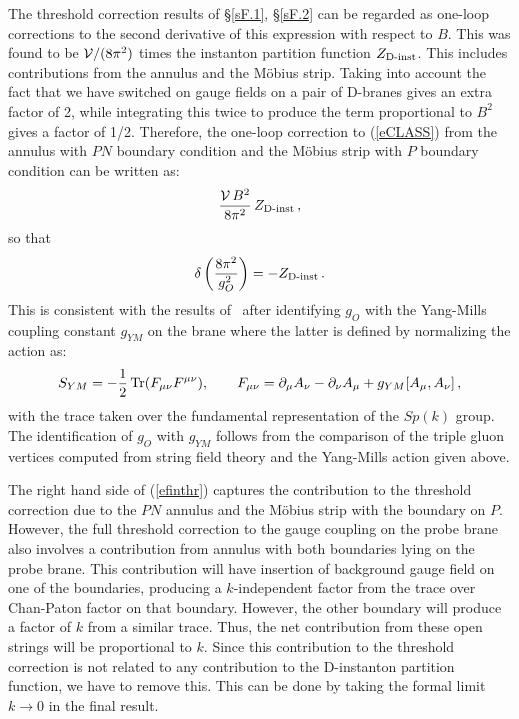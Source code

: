 \documentclass[12pt,a4paper]{article}
\newcommand{\be}{\begin{equation}}
\newcommand{\ee}{\end{equation}}
\newcommand{\refb}[1]{(\ref{#1})}
\newcommand{\p}{\partial}
\def\Tr{{\rm Tr} }
\newcommand{\VV}{{\cal V}}
\begin{document}
The threshold correction results of \S\ref{sF.1}, \S\ref{sF.2} can be regarded as one-loop corrections to the
second derivative of this expression with respect to $B$.
This was found to be $\VV/(8\pi^2)$ times the instanton partition function
$Z_{\mbox{\scriptsize D-inst}}$. This includes contributions from the annulus and
the M\"{o}bius strip. Taking into
account the fact that we have switched on gauge fields on
a pair of D-branes gives an extra factor of 2, while integrating this
twice to produce the term proportional to $B^2$ gives a factor of 1/2. Therefore, the
one-loop correction to \refb{eCLASS} from the annulus with $PN$ boundary condition
and the M\"{o}bius strip with $P$ boundary condition can be written as:
\be
\frac{\VV\, B^2}{8\pi^2} \, Z_{\mbox{\scriptsize D-inst}}\, ,
\ee
so that
\be \label{efinthr}
\delta\,{ \left( 8\pi^2\over g_O^2 \right) } = - Z_{\mbox{\scriptsize D-inst}}\, .
\ee
This is consistent with the results of~\cite{Akerblom:2007uc} after identifying $g_O$
with the Yang-Mills coupling constant $g_{YM}$ on the brane where the latter is defined by normalizing the action as:
\be
S_{YM} =-{1\over 2}\,  \Tr(F_{\mu\nu} F^{\mu\nu}), \qquad
F_{\mu\nu} =\p_\mu A_\nu - \p_\nu A_\mu + g_{YM} [A_\mu, A_\nu]\, ,
\ee
with the trace taken over the fundamental representation of the $Sp(k)$ group.
The identification of $g_O$
with $g_{YM}$ follows from the comparison of the triple gluon vertices computed from
string field theory and the Yang-Mills action given above.

The right hand side of \refb{efinthr} captures the contribution to the threshold
correction due to the $PN$ annulus and the M\"{o}bius strip with the boundary on $P$.
However, the full threshold correction to the gauge coupling on the probe brane also involves a contribution from
annulus with both boundaries lying on the probe brane.
This contribution  will have insertion of background gauge
field on one of the boundaries, producing a $k$-independent factor from the trace
over Chan-Paton factor on that boundary. However, the other boundary will produce
a factor of $k$ from a similar trace. Thus, the net contribution from these
open strings will be proportional to $k$.
Since this contribution to the threshold correction is not related
to any contribution to the D-instanton partition function, we have to remove this. This can
be done by taking the formal limit $k\to 0$ in the final result.
\end{document}
